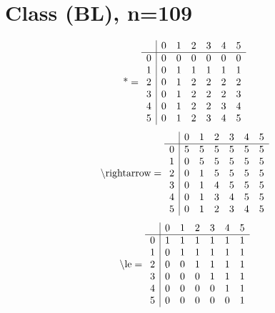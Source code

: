 \documentclass[11pt]{article}
\begin{document}
\section{Class (BL), n=109}
\[\text{*} = 
\begin{array}{r | r r r r r r}
 & 0 & 1 & 2 & 3 & 4 & 5 \\ \hline
0 & 0 & 0 & 0 & 0 & 0 & 0 \\
1 & 0 & 1 & 1 & 1 & 1 & 1 \\
2 & 0 & 1 & 2 & 2 & 2 & 2 \\
3 & 0 & 1 & 2 & 2 & 2 & 3 \\
4 & 0 & 1 & 2 & 2 & 3 & 4 \\
5 & 0 & 1 & 2 & 3 & 4 & 5 \\
\end{array}
\]
\[\text{\textbackslash rightarrow} = 
\begin{array}{r | r r r r r r}
 & 0 & 1 & 2 & 3 & 4 & 5 \\ \hline
0 & 5 & 5 & 5 & 5 & 5 & 5 \\
1 & 0 & 5 & 5 & 5 & 5 & 5 \\
2 & 0 & 1 & 5 & 5 & 5 & 5 \\
3 & 0 & 1 & 4 & 5 & 5 & 5 \\
4 & 0 & 1 & 3 & 4 & 5 & 5 \\
5 & 0 & 1 & 2 & 3 & 4 & 5 \\
\end{array}
\]
\[\text{\textbackslash le} = 
\begin{array}{r | r r r r r r}
 & 0 & 1 & 2 & 3 & 4 & 5 \\ \hline
0 & 1 & 1 & 1 & 1 & 1 & 1 \\
1 & 0 & 1 & 1 & 1 & 1 & 1 \\
2 & 0 & 0 & 1 & 1 & 1 & 1 \\
3 & 0 & 0 & 0 & 1 & 1 & 1 \\
4 & 0 & 0 & 0 & 0 & 1 & 1 \\
5 & 0 & 0 & 0 & 0 & 0 & 1 \\
\end{array}
\]
\end{document}
